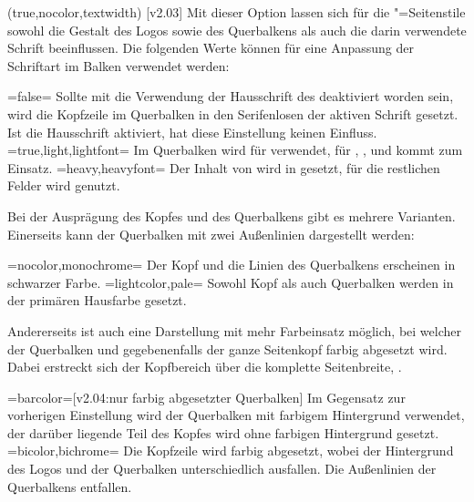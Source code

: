 \begin{DeclareEntity*}{}
\begin{DeclareEntity*}{}
\begin{DeclareEntity*}{}
\begin{Declaration}
  {}
  (true,nocolor,textwidth)
  [v2.03]
Mit dieser Option lassen sich für die "=Seitenstile 
sowohl die Gestalt des Logos sowie des Querbalkens als auch die darin 
verwendete Schrift beeinflussen. Die folgenden Werte können für eine Anpassung 
der Schriftart im Balken verwendet werden:
%
\begin{DeclareValues}
\itemval=false=
  Sollte mit  die Verwendung der Hausschrift des \TUDCDs 
  deaktiviert worden sein, wird die Kopfzeile im Querbalken in den Serifenlosen 
  der aktiven Schrift gesetzt. Ist die Hausschrift aktiviert, hat diese 
  Einstellung keinen Einfluss.
\itemval*=true,light,lightfont=
  Im Querbalken wird für   
  verwendet, für , , 
   und  kommt  zum 
  Einsatz.
\itemval=heavy,heavyfont=
  Der Inhalt von  wird in  gesetzt, für 
  die restlichen Felder wird  genutzt.
\end{DeclareValues}
%
Bei der Ausprägung des Kopfes und des Querbalkens gibt es mehrere Varianten. 
Einerseits kann der Querbalken mit zwei Außenlinien dargestellt werden:
%
\begin{DeclareValues}
\itemval=nocolor,monochrome=
  Der Kopf und die Linien des Querbalkens erscheinen in schwarzer Farbe.
\itemval=lightcolor,pale=
  Sowohl Kopf als auch Querbalken werden in der primären Hausfarbe gesetzt.
\end{DeclareValues}
%
Andererseits ist auch eine Darstellung mit mehr Farbeinsatz möglich, bei 
welcher der Querbalken und gegebenenfalls der ganze Seitenkopf farbig 
abgesetzt wird. Dabei erstreckt sich der Kopfbereich über die komplette 
Seitenbreite, .
%
\begin{DeclareValues}
\itemval=barcolor=[v2.04:nur farbig abgesetzter Querbalken]
  Im Gegensatz zur vorherigen Einstellung wird der Querbalken mit farbigem 
  Hintergrund verwendet, der darüber liegende Teil des Kopfes wird ohne 
  farbigen Hintergrund gesetzt.
\itemval=bicolor,bichrome=
  Die Kopfzeile wird farbig abgesetzt, wobei der Hintergrund des Logos und der 
  Querbalken unterschiedlich ausfallen. Die Außenlinien der Querbalkens 
  entfallen.
\end{DeclareValues}

\end{Declaration}
\end{DeclareEntity*}
\end{DeclareEntity*}
\end{DeclareEntity*}
